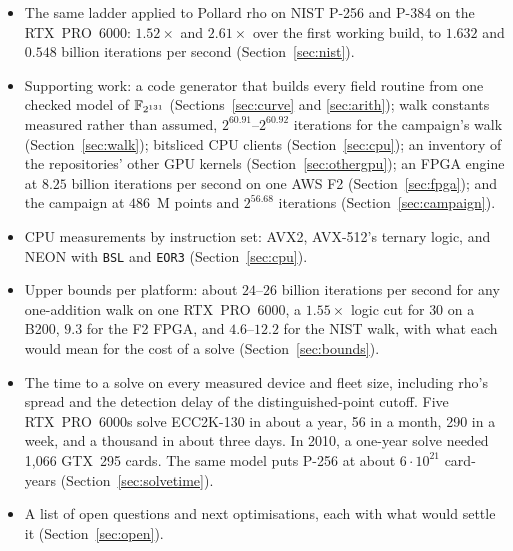 \begin{itemize}[leftmargin=1.2em,itemsep=0.3em]
\item The same ladder applied to Pollard rho on NIST P-256 and P-384 on
  the RTX~PRO~6000: $1.52\times$ and $2.61\times$ over the first working
  build, to $1.632$ and $0.548$ billion iterations per second
  (Section~\ref{sec:nist}).
\item Supporting work: a code generator that builds every field routine
  from one checked model of $\mathbb{F}_{2^{131}}$
  (Sections~\ref{sec:curve} and \ref{sec:arith}); walk constants
  measured rather than assumed, $2^{60.91}$--$2^{60.92}$ iterations for
  the campaign's walk (Section~\ref{sec:walk}); bitsliced CPU clients
  (Section~\ref{sec:cpu}); an inventory of the repositories' other GPU
  kernels (Section~\ref{sec:othergpu}); an FPGA engine at $8.25$ billion
  iterations per second on one AWS F2 (Section~\ref{sec:fpga}); and the
  campaign at $486$~M points and $2^{56.68}$ iterations
  (Section~\ref{sec:campaign}).
\item CPU measurements by instruction set: AVX2, AVX-512's ternary
  logic, and NEON with \texttt{BSL} and \texttt{EOR3}
  (Section~\ref{sec:cpu}).
\item Upper bounds per platform: about $24$--$26$ billion iterations per
  second for any one-addition walk on one RTX~PRO~6000, a $1.55\times$
  logic cut for $30$ on a B200, $9.3$ for the F2 FPGA, and $4.6$--$12.2$ for
  the NIST walk, with what each would mean for the cost of a solve
  (Section~\ref{sec:bounds}).
\item The time to a solve on every measured device and fleet size,
  including rho's spread and the detection delay of the
  distinguished-point cutoff. Five RTX~PRO~6000s solve ECC2K-130 in
  about a year, 56 in a month, 290 in a week, and a thousand in about
  three days. In 2010, a one-year solve needed 1{,}066 GTX~295 cards. The
  same model puts P-256 at about $6\cdot10^{21}$ card-years
  (Section~\ref{sec:solvetime}).
\item A list of open questions and next optimisations, each with what
  would settle it (Section~\ref{sec:open}).
\end{itemize}


